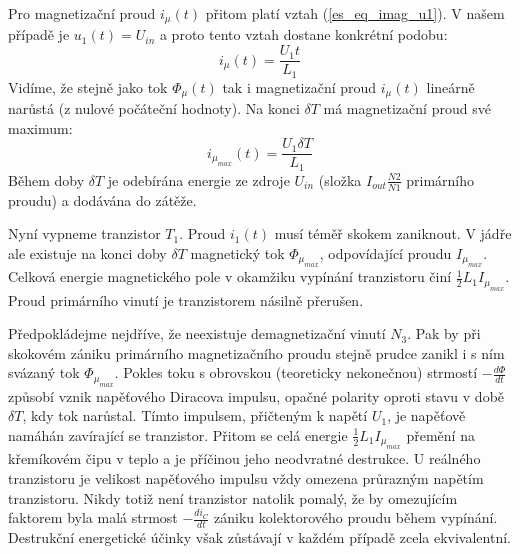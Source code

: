      Pro magnetizační proud $i_\mu(t)$ přitom platí vztah (\ref{es_eq_imag_u1}). V našem případě je
      $u_1(t)=U_{in}$ a proto tento vztah dostane konkrétní podobu:
      \begin{equation}\label{ENZ:eq_forward_imagt}
       i_\mu(t) = \frac{U_1t}{L_1}
      \end{equation}
      Vidíme, že stejně jako tok $\Phi_\mu(t)$ tak i magnetizační proud $i_\mu(t)$ lineárně narůstá 
      (z nulové počáteční hodnoty). Na konci $\delta T$ má magnetizační proud své maximum:
      \begin{equation}\label{ENZ:eq_forward_imag_max}
       i_{\mu_{max}}(t) = \frac{U_1\delta T}{L_1}
      \end{equation}
      Během doby $\delta T$ je odebírána energie ze zdroje $U_{in}$ (složka $I_{out}\frac{N2}{N1}$
      primárního proudu) a dodávána do zátěže.
      
      Nyní vypneme tranzistor $T_1$. Proud $i_1(t)$ musí téměř skokem zaniknout. V jádře ale 
      existuje na konci doby $\delta T$ magnetický tok $\Phi_{\mu_{max}}$, odpovídající proudu 
      $I_{\mu_{max}}$. Celková energie magnetického pole v okamžiku vypínání tranzistoru činí 
      $\frac{1}{2}L_1I_{\mu_{max}}$. Proud primárního vinutí je tranzistorem násilně přerušen.
      
      Předpokládejme nejdříve, že neexistuje demagnetizační vinutí $N_3$. Pak by při skokovém zániku
      primárního magnetizačního proudu stejně prudce zanikl i s ním svázaný tok $\Phi_{\mu_{max}}$. 
      Pokles toku s obrovskou (teoreticky nekonečnou) strmostí $-\frac{d\Phi}{dt}$ způsobí vznik 
      napěťového Diracova impulsu, opačné polarity oproti stavu v době $\delta T$, kdy tok narůstal. 
      Tímto impulsem, přičteným k napětí $U_1$, je napěťově namáhán zavírající se tranzistor. Přitom 
      se celá energie $\frac{1}{2}L_1I_{\mu_{max}}$ přemění na křemíkovém čipu v teplo a je příčinou 
      jeho neodvratné destrukce. U reálného tranzistoru je velikost napěťového impulsu vždy omezena 
      průrazným napětím tranzistoru. Nikdy totiž není tranzistor natolik pomalý, že by omezujícím 
      faktorem byla malá strmost $-\frac{di_C}{dt}$ zániku kolektorového proudu během vypínání. 
      Destrukční energetické účinky však zůstávají v každém případě zcela ekvivalentní.              
      
